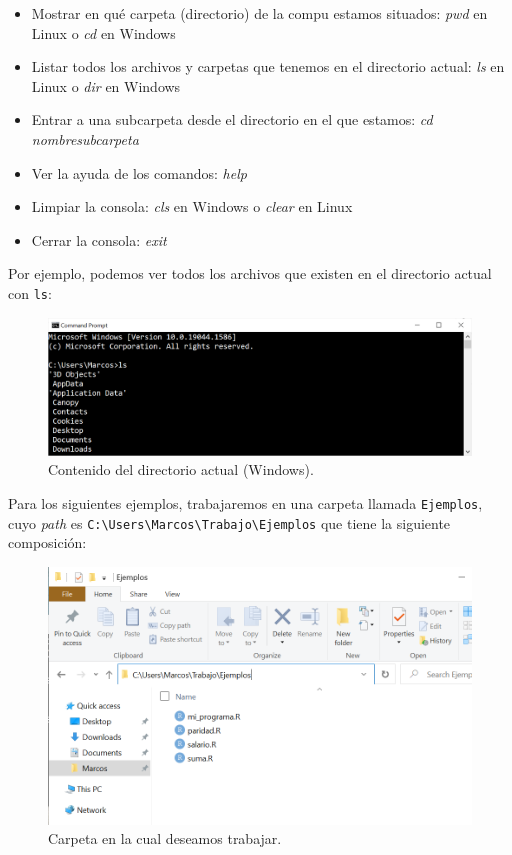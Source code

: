 \documentclass[
]{book}
\providecommand{\tightlist}{%
  \setlength{\itemsep}{0pt}\setlength{\parskip}{0pt}}
\begin{document}
\begin{itemize}
\tightlist
\item
  Mostrar en qué carpeta (directorio) de la compu estamos situados: \emph{pwd} en Linux o \emph{cd} en Windows
\item
  Listar todos los archivos y carpetas que tenemos en el directorio actual: \emph{ls} en Linux o \emph{dir} en Windows
\item
  Entrar a una subcarpeta desde el directorio en el que estamos: \emph{cd nombresubcarpeta}
\item
  Ver la ayuda de los comandos: \emph{help}
\item
  Limpiar la consola: \emph{cls} en Windows o \emph{clear} en Linux
\item
  Cerrar la consola: \emph{exit}
\end{itemize}

Por ejemplo, podemos ver todos los archivos que existen en el directorio actual con \texttt{ls}:

\begin{figure}

{\centering \includegraphics[width=0.8\linewidth]{images/07_otros/terminal3} 

}

\caption{Contenido del directorio actual (Windows).}\label{fig:unnamed-chunk-281}
\end{figure}

Para los siguientes ejemplos, trabajaremos en una carpeta llamada \texttt{Ejemplos}, cuyo \emph{path} es \texttt{C:\textbackslash{}Users\textbackslash{}Marcos\textbackslash{}Trabajo\textbackslash{}Ejemplos} que tiene la siguiente composición:

\begin{figure}

{\centering \includegraphics[width=0.8\linewidth]{images/07_otros/terminal4} 

}

\caption{Carpeta en la cual deseamos trabajar.}\label{fig:unnamed-chunk-282}
\end{figure}
\end{document}
